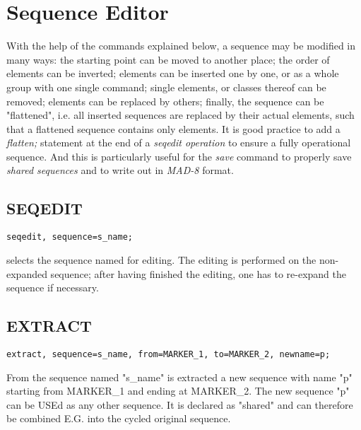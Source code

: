 
\chapter{Sequence Editor}
\label{chap:seqedit}
With the help of the commands explained below, a sequence may be
modified in many ways: the starting point can be moved to another place;
the order of elements can be inverted; elements can be inserted one by
one, or as a whole group with one single command; single elements, or
classes thereof can be removed; elements can be replaced by others;
finally, the sequence can be "flattened", i.e. all inserted sequences
are replaced by their actual elements, such that a flattened sequence
contains only elements. It is good practice to add a \textit{ flatten; }
statement at the end of a \textit{ seqedit operation } to ensure a fully
operational sequence. And this is particularly useful for the \textit{
  save } command to properly save \textit{ shared sequences } and to
write out in \textit{ MAD-8 } format.  


\section{SEQEDIT}
\begin{verbatim}
seqedit, sequence=s_name;
\end{verbatim} 
selects the sequence named for editing. The editing is performed on the
non-expanded sequence; after having finished the editing, one has to
re-expand the sequence if necessary.  

\section{EXTRACT}
\begin{verbatim}
extract, sequence=s_name, from=MARKER_1, to=MARKER_2, newname=p;
\end{verbatim} 
From the sequence named "s\_name" is extracted a new sequence with name
"p" starting from MARKER\_1 and ending at MARKER\_2. The new sequence
"p" can be USEd as any other sequence. It is declared as "shared" and
can therefore be combined E.G. into the cycled original sequence.  

